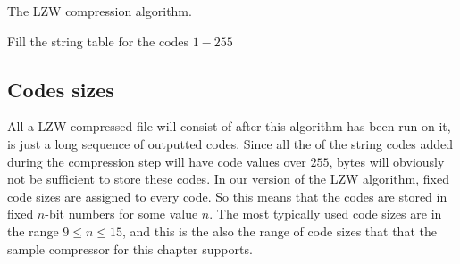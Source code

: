 \begin{algorithm}[H]
  \caption{The LZW compression algorithm.}
  \label{alg:lzw-compression}
  \begin{algorithmic}[1]


    \State Fill the string table for the codes $1-255$
     

    \While{\neof}

       \label{algl:hasingcheckintable}

      \Else

        \State {}

          

          \State {}\label{algl:hashadd}

        \EndIf


      \EndIf


    \EndWhile

    \State {}
    \State {}
  \end{algorithmic}
\end{algorithm}

\subsection{Codes sizes}

All a LZW compressed file will consist of after this algorithm has
been run on it, is just a long sequence of outputted codes.  Since all
the of the string codes added during the compression step will have
code values over $255$, bytes will obviously not be sufficient to
store these codes. In our version of the LZW algorithm, fixed code
sizes are assigned to every code. So this means that the codes are
stored in fixed $n$-bit numbers for some value $n$. The most typically
used code sizes are in the range $9 \leq n \leq 15$, and this is the
also the range of code sizes that that the sample compressor for this
chapter supports.

